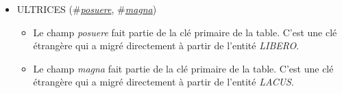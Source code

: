 \documentclass[a4paper]{article}
\newcommand{\relat}[1]{\textsc{#1}}
\newcommand{\prim}[1]{\uline{#1}}
\newcommand{\foreign}[1]{\#\textsl{#1}}
\begin{document}
\begin{itemize}
  \item \relat{ULTRICES} (\foreign{\prim{posuere}}, \foreign{\prim{magna}})
  \begin{itemize}
    \item Le champ \emph{posuere} fait partie de la clé primaire de la table. C'est une clé étrangère qui a migré directement à partir de l'entité \emph{LIBERO}.
    \item Le champ \emph{magna} fait partie de la clé primaire de la table. C'est une clé étrangère qui a migré directement à partir de l'entité \emph{LACUS}.
  \end{itemize}

\end{itemize}
\end{document}
